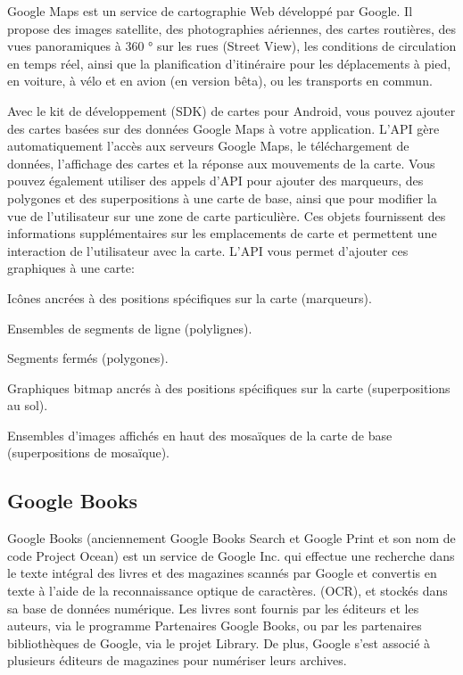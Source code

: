 Google Maps est un service de cartographie Web développé par Google. Il propose des images satellite, des photographies aériennes, des cartes routières, des vues panoramiques à 360 ° sur les rues (Street View), les conditions de circulation en temps réel, ainsi que la planification d'itinéraire pour les déplacements à pied, en voiture, à vélo et en avion (en version bêta), ou les transports en commun.

Avec le kit de développement (SDK) de cartes pour Android, vous pouvez ajouter des cartes basées sur des données Google Maps à votre application. L'API gère automatiquement l'accès aux serveurs Google Maps, le téléchargement de données, l'affichage des cartes et la réponse aux mouvements de la carte. Vous pouvez également utiliser des appels d'API pour ajouter des marqueurs, des polygones et des superpositions à une carte de base, ainsi que pour modifier la vue de l'utilisateur sur une zone de carte particulière. Ces objets fournissent des informations supplémentaires sur les emplacements de carte et permettent une interaction de l'utilisateur avec la carte. L'API vous permet d'ajouter ces graphiques à une carte:

\begin{list}{•}{}
\item Icônes ancrées à des positions spécifiques sur la carte (marqueurs).
\item Ensembles de segments de ligne (polylignes).
\item Segments fermés (polygones).
\item Graphiques bitmap ancrés à des positions spécifiques sur la carte (superpositions au sol).
\item Ensembles d'images affichés en haut des mosaïques de la carte de base (superpositions de mosaïque).
\end{list}

\subsection{Google Books}
Google Books (anciennement Google Books Search et Google Print et son nom de code Project Ocean) est un service de Google Inc. qui effectue une recherche dans le texte intégral des livres et des magazines scannés par Google et convertis en texte à l'aide de la reconnaissance optique de caractères. (OCR), et stockés dans sa base de données numérique. Les livres sont fournis par les éditeurs et les auteurs, via le programme Partenaires Google Books, ou par les partenaires bibliothèques de Google, via le projet Library. De plus, Google s'est associé à plusieurs éditeurs de magazines pour numériser leurs archives.\cite{noauthor_google_nodate}


